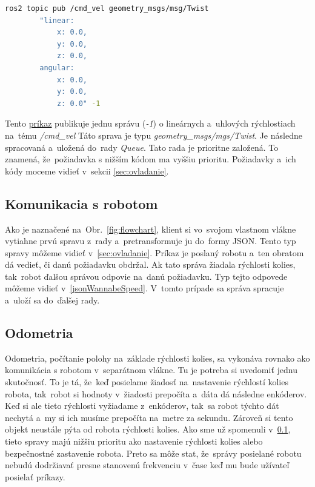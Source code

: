 \label{requestCommand}
\begin{lstlisting}[language=bash]
	ros2 topic pub /cmd_vel geometry_msgs/msg/Twist
		"linear:
			x: 0.0,
			y: 0.0,
			z: 0.0,
		angular:
			x: 0.0,
			y: 0.0,
			z: 0.0" -1
\end{lstlisting}

Tento \hyperref[requestCommand]{príkaz} publikuje jednu správu (\textit{-1}) o lineárnych a~uhlových rýchlostiach na~tému \textit{/cmd\_vel}
Táto sprava je typu \textit{geometry\_msgs/mgs/Twist}. Je následne spracovaná a~uložená do~rady \textit{Queue}. Tato rada je prioritne založená.
To znamená, že~požiadavka s nižším kódom ma vyššiu prioritu. Požiadavky a~ich kódy moceme vidieť v~sekcii \ref{sec:ovladanie}.

\subsection{Komunikacia s robotom}
\label{sec:robotComms}

Ako je naznačené na~Obr.~\ref{fig:flowchart}, klient si vo~svojom vlastnom vlákne vytiahne prvú spravu z~rady a~pretransformuje ju do~formy JSON.
Tento typ spravy môžeme vidieť v~\ref{sec:ovladanie}. Príkaz je poslaný robotu a~ten obratom dá vedieť, či danú požiadavku obdržal. Ak tato správa
žiadala rýchlosti kolies, tak~robot ďalšou správou odpovie na~danú požiadavku. Typ tejto odpovede môžeme vidieť v~\ref{jsonWannabeSpeed}. V~tomto prípade
sa správa spracuje a~uloží sa do~ďalšej rady.

\subsection{Odometria}
\label{sec:odometria}

Odometria, počítanie polohy na~základe rýchlosti kolies, sa vykonáva rovnako ako komunikácia s robotom v~separátnom vlákne. Tu je potreba si uvedomiť
jednu skutočnosť. To je tá, že~keď posielame žiadosť na~nastavenie rýchlostí kolies robota, tak~robot si hodnoty v~žiadosti prepočíta a~dáta dá následne
enkóderov. Keď si ale tieto rýchlosti vyžiadame z~enkóderov, tak~sa robot týchto dát nechytá a~my si ich musíme prepočíta na~metre za sekundu. Zároveň
si tento objekt neustále pýta od robota rýchlosti kolies. Ako sme už spomenuli v~\ref{sec:robotComms}, tieto spravy majú nižšiu prioritu ako nastavenie
rýchlosti kolies alebo bezpečnostné zastavenie robota. Preto sa môže stat, že~správy posielané robotu nebudú dodržiavať presne stanovenú frekvenciu v~čase
keď mu bude užívateľ posielať príkazy.

